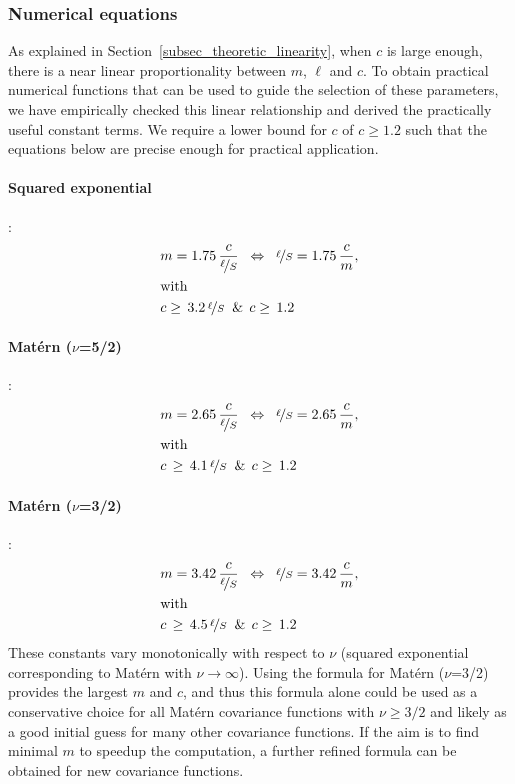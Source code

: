 \subsubsection{Numerical equations}
\label{sec_num_equations}

As explained in Section~\ref{subsec_theoretic_linearity}, when $c$ is large enough, there is a near linear proportionality between $m$, $\ell$ and $c$. To obtain practical numerical functions that can be used to guide the selection of these parameters, we have empirically {\color{blue}checked this linear relationship and} derived the practically useful constant terms. We require a lower bound for $c$ of $c \geq 1.2$ such that the equations below are precise enough for practical application.

\paragraph*{Squared exponential}:
%
\begin{align}
&m= 1.75 \, \frac{c}{\nicefrac{\ell}{S}} \;\; \Leftrightarrow \;\; \nicefrac{\ell}{S}= 1.75 \, \frac{c}{m},	\label{eq_m_l_QE} \\
&\text{with} \nonumber \\
&c \geq \, 3.2 \, \nicefrac{\ell}{S} \;\; \& \;\, c \geq \, 1.2	\label{eq_c_vs_l_QE}
\end{align}

\paragraph*{Mat\'ern ($\nu$=5/2)}:
%
\begin{align}
&m= 2.65 \, \frac{c}{\nicefrac{\ell}{S}} \;\; \Leftrightarrow \;\; \nicefrac{\ell}{S}= 2.65 \, \frac{c}{m}, \label{eq_m_l_mat52} \\
&\text{with} \nonumber \\
&c \, \geq \, 4.1 \, \nicefrac{\ell}{S} \;\; \& \;\, c \geq \, 1.2  \label{eq_c_vs_l_mat52}
\end{align}

\paragraph*{Mat\'ern ($\nu$=3/2)}:
%
\begin{align}
&m= 3.42 \, \frac{c}{\nicefrac{\ell}{S}} \;\; \Leftrightarrow \;\; \nicefrac{\ell}{S}= 3.42 \, \frac{c}{m}, \label{eq_m_l_mat32}\\
&\text{with} \nonumber \\
&c \, \geq \, 4.5 \, \nicefrac{\ell}{S} \;\; \& \;\, c \geq \, 1.2 \label{eq_c_vs_l_mat32}
\end{align}
%
These constants vary monotonically with respect to $\nu$ (squared exponential corresponding to Mat\'ern with $\nu \to \infty$). Using the formula for Mat\'ern ($\nu$=3/2) provides the largest $m$ and $c$, and thus this formula alone could be used as a conservative choice for all Mat\'ern covariance functions with $\nu \geq 3/2$ and likely as a good initial guess for many other covariance functions. If the aim is to find minimal $m$ to speedup the computation, a further refined formula can be obtained for new covariance functions.

